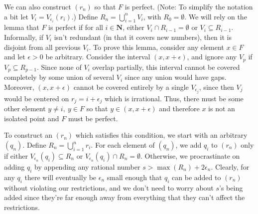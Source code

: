 \begin{solution}
{We can also construct \((r_n)\) so that \(F\) is perfect. (Note: To simplify the notation a bit let \(V_i = V_{\epsilon_i}(r_i)\).) Define \(R_n = \bigcup^n_{i=1} V_i\), with \(R_0 = \emptyset\). We will rely on the lemma that \(F\) is perfect if for all \(i \in \mathbf{N}\), either \(V_i \cap R_{i-1} = \emptyset\) or \(V_i \subseteq R_{i-1}\). Informally, if \(V_i\) isn't redundant (in that it covers new numbers), then it is disjoint from all previous \(V_i\). To prove this lemma, consider any element \(x \in F\) and let \(\epsilon >0\) be arbitrary. Consider the interval \((x, x + \epsilon)\), and ignore any \(V_p\) if \(V_p \subseteq R_{p-1}\). Since none of \(V_i\) overlap partially, this interval cannot be covered completely by some union of several \(V_i\) since any union would have gaps. Moreover, \((x, x + \epsilon)\) cannot be covered entirely by a single \(V_{\epsilon_j}\), since then \(V_j\) would be centered on \(r_j = i + \epsilon_j\) which is irrational. Thus, there must be some other element \(y \neq i,\ y\in F\) so that \(y \in (x, x + \epsilon)\) and therefore \(x\) is not an isolated point and \(F\) must be perfect.

To construct an \((r_n)\) which satisfies this condition, we start with an arbitrary \((q_n)\). Define \(R_n = \bigcup^n_{i=1} r_i\). For each element of \((q_n)\), we add \(q_i\) to \((r_n)\) only if either \(V_{\epsilon_n}(q_i) \subseteq R_n\) or \(V_{\epsilon_n}(q_i) \cap R_n = \emptyset\). Otherwise, we procrastinate on adding \(q_i\) by appending any rational number \(s > \max(R_n) + 2 \epsilon_n\). Clearly, for any \(q_i\) there will eventually be \(\epsilon_n\) small enough that \(q_i\) can be added to \((r_n)\) without violating our restrictions, and we don't need to worry about \(s\)'s being added since they're far enough away from everything that they can't affect the restrictions.

  }

\end{solution}

